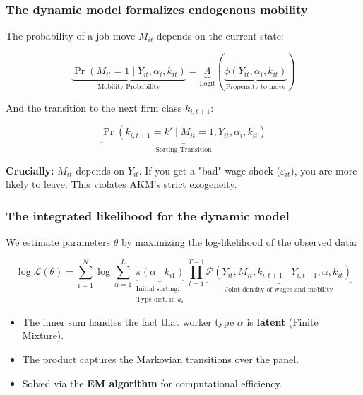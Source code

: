 \begin{frame}
    \frametitle{The dynamic model formalizes endogenous mobility}
    
    The probability of a job move $M_{it}$ depends on the current state:
    
    \[ \underbrace{\Pr(M_{it} = 1 \mid Y_{it}, \alpha_i, k_{it})}_{\text{Mobility Probability}} = \underbrace{\Lambda}_{\text{Logit}} \left( \underbrace{\phi(Y_{it}, \alpha_i, k_{it})}_{\text{Propensity to move}} \right) \]
    
    \vspace{0.3cm}
    And the transition to the next firm class $k_{i,t+1}$:
    
    \[ \underbrace{\Pr(k_{i,t+1} = k' \mid M_{it}=1, Y_{it}, \alpha_i, k_{it})}_{\text{Sorting Transition}} \]
    
    \vspace{0.3cm}
    \textbf{Crucially:} $M_{it}$ depends on $Y_{it}$. If you get a "bad" wage shock ($\varepsilon_{it}$), you are more likely to leave. This violates AKM's strict exogeneity.
\end{frame}

\begin{frame}
    \frametitle{The integrated likelihood for the dynamic model}
    
    We estimate parameters $\theta$ by maximizing the log-likelihood of the observed data:
    
    \[ \log \mathcal{L}(\theta) = \sum_{i=1}^N \log \sum_{\alpha=1}^L \underbrace{\pi(\alpha \mid k_{i1})}_{\substack{\text{Initial sorting:} \\ \text{Type dist. in } k_1}} \prod_{t=1}^{T-1} \underbrace{\mathcal{P}(Y_{it}, M_{it}, k_{i,t+1} \mid Y_{i,t-1}, \alpha, k_{it})}_{\text{Joint density of wages and mobility}} \]
    
    \vspace{0.5cm}
    \begin{itemize}
        \item The inner sum handles the fact that worker type $\alpha$ is \textbf{latent} (Finite Mixture).
        \item The product captures the Markovian transitions over the panel.
        \item Solved via the \textbf{EM algorithm} for computational efficiency.
    \end{itemize}
\end{frame}


